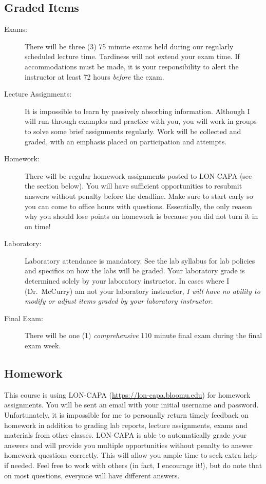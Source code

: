 \documentclass[11pt,letterpaper]{article}
\begin{document}
\subsection{Graded Items}
\begin{description}
	\item[Exams:] There will be three (3) 75 minute exams held during our
		regularly scheduled lecture time. Tardiness will not extend your
		exam time. If accommodations must be made, it is your
		responsibility to alert the instructor at least 72 hours
		\emph{before} the exam.
	\item[Lecture Assignments:] It is impossible to learn by passively
		absorbing information. Although I will run through examples and
		practice with you, you will work in groups to solve some brief
		assignments regularly. Work will be collected and graded, with
		an emphasis placed on participation and attempts.
	\item[Homework:] There will be regular homework assignments posted to
		LON-CAPA (see the  section below). You will have sufficient
		opportunities to resubmit answers without penalty before the
		deadline. Make sure to start early so you can come to office
		hours with questions. Essentially, the only reason why you
		should lose points on homework is because you did not turn it in
		on time!
	\item[Laboratory:] Laboratory attendance is mandatory. See the lab
		syllabus for lab policies and specifics on how the labs will be
		graded. Your laboratory grade is determined solely by your
		laboratory instructor. In cases where I (Dr.\ McCurry) am not
		your laboratory instructor, \emph{I will have no ability to
		modify or adjust items graded by your laboratory instructor}.
	\item[Final Exam:] There will be one (1) \emph{comprehensive} 110 minute
		final exam during the final exam week. 
\end{description}

\subsection{Homework}\label{homework}
This course is using LON-CAPA (\url{https://lon-capa.bloomu.edu}) for homework
assignments. You will be sent an email with your initial username and password.
Unfortunately, it is impossible for me to personally return timely feedback on
homework in addition to grading lab reports, lecture assignments, exams and
materials from other classes. LON-CAPA is able to automatically grade your
answers and will provide you multiple opportunities without penalty to answer
homework questions correctly. This will allow you ample time to seek extra help
if needed. Feel free to work with others (in fact, I encourage it!), but do note
that on most questions, everyone will have different answers.
\end{document}
